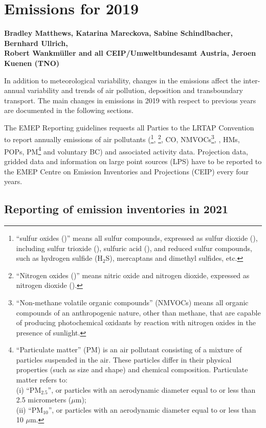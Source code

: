 \chapter[Emissions 2019]{Emissions for 2019}
\label{ch:emis2019}

{\bf{Bradley Matthews, Katarina Mareckova, Sabine Schindlbacher, Bernhard Ullrich, \\
Robert Wankm\"uller and all CEIP/Umweltbundesamt Austria, Jeroen Kuenen (TNO)}}
\vspace{30pt}

In addition to meteorological variability, changes in the emissions
affect the inter-annual variability and trends of air pollution,
deposition and transboundary transport.  
The main changes in emissions in 2019 with respect to previous years
are documented in the following sections.


The EMEP Reporting guidelines \citep{UNECE2014} requests all Parties
to the LRTAP Convention to report annually emissions of air pollutants
(\sox\footnote{``sulfur oxides (\sox)'' means all sulfur compounds,
  expressed as sulfur dioxide (\soii), including sulfur trioxide
  (\soiii), sulfuric acid (\sulacid), and reduced sulfur compounds,
  such as hydrogen sulfide (H${_2}$S), mercaptans and dimethyl
  sulfides, etc.}, \noii\footnote{``Nitrogen oxides (\nox)'' means
  nitric oxide and nitrogen dioxide, expressed as nitrogen dioxide
  (\noii).}, CO, NMVOCs\footnote{``Non-methane volatile organic
  compounds'' (NMVOCs) means all organic compounds of an anthropogenic
  nature, other than methane, that are capable of producing
  photochemical oxidants by reaction with nitrogen oxides in the
  presence of sunlight.}, \nhiii, HMs, POPs,
PM\footnote{``Particulate matter'' (PM) is an air pollutant
  consisting of a mixture of particles suspended in the air. These
  particles differ in their physical properties (such as size and
  shape) and chemical composition. Particulate matter refers to:\\  
(i) ``PM$_{2.5}$'', or particles with an aerodynamic diameter equal to or
  less than 2.5 micrometers ($\mu$m);\\ 
(ii) ``PM$_{10}$'', or particles with an aerodynamic diameter equal to or
  less than 10 $\mu$m.} and voluntary BC) and associated activity data. Projection data, gridded data and information on large point sources (LPS) 
have to be reported to the EMEP Centre on Emission Inventories and Projections (CEIP) every four years.

\section{Reporting of emission inventories in 2021}

